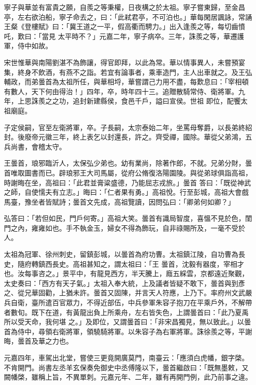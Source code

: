 \begin{pinyinscope}
 寧子與華並有富貴之願，自羨之等秉權，日夜構之於太祖。寧子嘗東歸，至金昌亭，左右欲泊船，寧子命去之，曰：「此弒君亭，不可泊也。」華每閑居諷詠，常誦王粲《登樓賦》曰：「冀王道之一平，假高衢而騁力。」出入逢羨之等，每切齒憤吒，歎曰：「當見
 太平時不？」元嘉二年，寧子病卒。三年，誅羨之等，華遷護軍，侍中如故。



 宋世惟華與南陽劉湛不為飾讓，得官即拜，以此為常。華以情事異人，未嘗預宴集，終身不飲酒，有燕不之詣。若宜有論事者，乘車造門，主人出車就之。及王弘輔政，而弟曇首為太祖所任，與華相埒，華嘗謂己力用不盡，每歎息曰：「宰相頓有數人，天下何由得治！」四年，卒，時年四十三。追贈散騎常侍、衛將軍。九年，上思誅羨之之功，追封新建縣侯，食邑千戶，謚曰宣侯。世祖
 即位，配饗太祖廟庭。



 子定侯嗣，官至左衛將軍，卒。子長嗣，太宗泰始二年，坐罵母奪爵，以長弟終紹封。後廢帝元徽三年，終上表乞以封還長，許之。齊受禪，國除。華從父弟鴻，五兵尚書，會稽太守。



 王曇首，琅邪臨沂人，太保弘少弟也。幼有業尚，除著作郎，不就。兄弟分財，曇首唯取圖書而已。辟琅邪王大司馬屬，從府公脩復洛陽園陵。與從弟球俱詣高祖，時謝晦在坐，高祖曰：「此君並膏粱盛德，乃能屈志戎旅。」曇首
 答曰：「既從神武之師，自使懦夫有立志。」晦曰：「仁者果有勇。」高祖悅。行至彭城，高祖大會戲馬臺，豫坐者皆賦詩；曇首文先成，高祖覽讀，因問弘曰：「卿弟何如卿？」



 弘答曰：「若但如民，門戶何寄。」高祖大笑。曇首有識局智度，喜慍不見於色，閨門之內，雍雍如也。手不執金玉，婦女不得為飾玩，自非祿賜所及，一毫不受於人。



 太祖為冠軍、徐州刺史，留鎮彭城，以曇首為府功曹。太祖鎮江陵，自功曹為長史，隨府轉鎮西長史。高祖甚知之，謂太祖曰：「王
 曇首，沈毅有器度，宰相才也。汝每事咨之。」景平中，有龍見西方，半天騰上，廕五綵雲，京都遠近聚觀，太史奏曰：「西方有天子氣。」太祖入奉大統，上及議者皆疑不敢下，曇首與到彥之、從兄華固勸，上猶未許。曇首又固陳，并言天人符應，上乃下。率府州文武嚴兵自衛，臺所遣百官眾力，不得近部伍，中兵參軍朱容子抱刀在平乘戶外，不解帶者數旬。既下在道，有黃龍出負上所乘舟，左右皆失色，上謂曇首曰：「此乃夏禹所以受天命，我何堪
 之。」及即位，又謂曇首曰：「非宋昌獨見，無以致此。」以曇首為侍中，尋領右衛將軍，領驍騎將軍。以朱容子為右軍將軍。誅徐羨之等，平謝晦，曇首及華之力也。



 元嘉四年，車駕出北堂，嘗使三更竟開廣莫門，南臺云：「應須白虎幡，銀字棨。不肯開門。尚書左丞羊玄保奏免御史中丞傅隆以下，曇首繼啟曰：「既無墨敕，又闕幡棨，雖稱上旨，不異單刺。元嘉元年、二年，雖有再開門例，此乃前事之違。




\end{pinyinscope}
